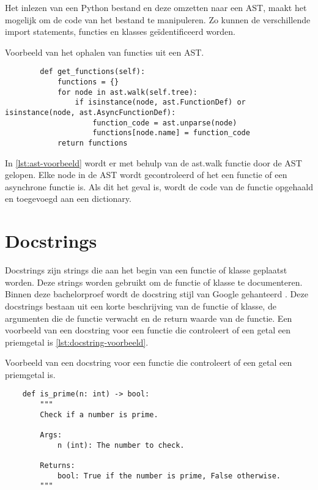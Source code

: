 Het inlezen van een Python bestand en deze omzetten naar een AST, maakt het mogelijk om de code van het bestand te manipuleren.
Zo kunnen de verschillende import statements, functies en klasses geïdentificeerd worden.

\begin{listing}
    \caption{Voorbeeld van het ophalen van functies uit een AST.}
    \label{lst:ast-voorbeeld}
    \begin{verbatim}
        def get_functions(self):
            functions = {}
            for node in ast.walk(self.tree):
                if isinstance(node, ast.FunctionDef) or isinstance(node, ast.AsyncFunctionDef):
                    function_code = ast.unparse(node)
                    functions[node.name] = function_code
            return functions
    \end{verbatim}
\end{listing}

In \ref{lst:ast-voorbeeld} wordt er met behulp van de ast.walk functie door de AST gelopen.
Elke node in de AST wordt gecontroleerd of het een functie of een asynchrone functie is.
Als dit het geval is, wordt de code van de functie opgehaald en toegevoegd aan een dictionary.

\section{Docstrings}
\label{sec:bestanddocumentatie-docstrings}
Docstrings zijn strings die aan het begin van een functie of klasse geplaatst worden.
Deze strings worden gebruikt om de functie of klasse te documenteren.
Binnen deze bachelorproef wordt de docstring stijl van Google gehanteerd \autocite{GPT2024}.
Deze docstrings bestaan uit een korte beschrijving van de functie of klasse, de argumenten die de functie verwacht en de return waarde van de functie.
Een voorbeeld van een docstring voor een functie die controleert of een getal een priemgetal is \ref{lst:docstring-voorbeeld}.

\begin{listing}
    \caption{Voorbeeld van een docstring voor een functie die controleert of een getal een priemgetal is.}
    \label{lst:docstring-voorbeeld}
    \begin{verbatim}
    def is_prime(n: int) -> bool:
        """
        Check if a number is prime.

        Args:
            n (int): The number to check.

        Returns:
            bool: True if the number is prime, False otherwise.
        """
    \end{verbatim}
\end{listing}

